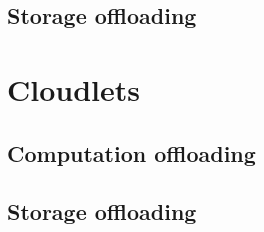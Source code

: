 \subsection{Storage offloading}




\section{Cloudlets}

\subsection{Computation offloading}

\subsection{Storage offloading}










